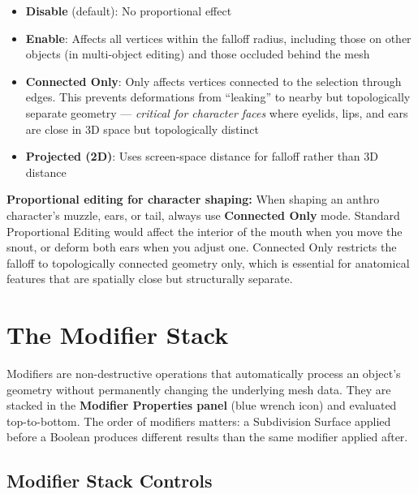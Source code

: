 \begin{itemize}[leftmargin=2em]
  \item \textbf{Disable} (default): No proportional effect
  \item \textbf{Enable}: Affects all vertices within the falloff radius, including those on other objects (in multi-object editing) and those occluded behind the mesh
  \item \textbf{Connected Only}: Only affects vertices connected to the selection through edges. This prevents deformations from ``leaking'' to nearby but topologically separate geometry --- \textit{critical for character faces} where eyelids, lips, and ears are close in 3D space but topologically distinct
  \item \textbf{Projected (2D)}: Uses screen-space distance for falloff rather than 3D distance
\end{itemize}

\begin{furrybox}
\textbf{Proportional editing for character shaping:} When shaping an anthro character's muzzle, ears, or tail, always use \textbf{Connected Only} mode. Standard Proportional Editing would affect the interior of the mouth when you move the snout, or deform both ears when you adjust one. Connected Only restricts the falloff to topologically connected geometry only, which is essential for anatomical features that are spatially close but structurally separate.
\end{furrybox}



\section{The Modifier Stack}
\label{sec:modifierstack}

Modifiers are non-destructive operations that automatically process an object's geometry without permanently changing the underlying mesh data. They are stacked in the \textbf{Modifier Properties panel} (blue wrench icon) and evaluated top-to-bottom. The order of modifiers matters: a Subdivision Surface applied before a Boolean produces different results than the same modifier applied after.

\subsection{Modifier Stack Controls}

